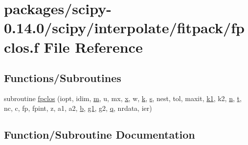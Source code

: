 \hypertarget{fpclos_8f}{}\section{packages/scipy-\/0.14.0/scipy/interpolate/fitpack/fpclos.f File Reference}
\label{fpclos_8f}
\subsection*{Functions/\+Subroutines}
\begin{DoxyCompactItemize}
\item 
subroutine \hyperlink{fpclos_8f_a304a014fe8cbda7f0754909c0f7b6cf3}{fpclos} (iopt, idim, \hyperlink{indexexpr_8h_ab72fdb4031d47b75ab26dd18a437bcdc}{m}, u, mx, \hyperlink{vecnorm1_8cc_ac73eed9e41ec09d58f112f06c2d6cb63}{x}, w, \hyperlink{indexexpr_8h_abb72938a198351550846b37a84588b63}{k}, \hyperlink{indexexpr_8h_ae024b0db549122b44c349ae28ec990dc}{s}, nest, tol, maxit, \hyperlink{cephes_8h_aea4a28d7f448efcb4713416bd1f3cf49}{k1}, k2, \hyperlink{indexexpr_8h_ab427e2e2b4d6cec55fa088ea2a692ace}{n}, \hyperlink{indexexpr_8h_a01709998b82be3f34e0412206618d09d}{t}, nc, c, fp, fpint, z, a1, a2, \hyperlink{gen__mat5files_8m_a7b38767b3b6a8dae167e5afa4fc340b0}{b}, \hyperlink{nnls_8f_a676cb7f0d762601224efd1660ce09789}{g1}, g2, \hyperlink{indexexpr_8h_ac886c3584e464b5533390d7440c9dd98}{q}, nrdata, ier)
\end{DoxyCompactItemize}


\subsection{Function/\+Subroutine Documentation}
\hypertarget{fpclos_8f_a304a014fe8cbda7f0754909c0f7b6cf3}{}
